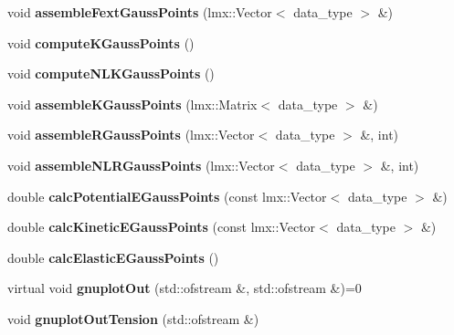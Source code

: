\begin{CompactItemize}
\item 
\hypertarget{classmknix_1_1Cell_7c381e6cbcdb2478505645cad57a2c6e}{
void \textbf{assembleFextGaussPoints} (lmx::Vector$<$ data\_\-type $>$ \&)}
\label{classmknix_1_1Cell_7c381e6cbcdb2478505645cad57a2c6e}

\item 
\hypertarget{classmknix_1_1Cell_379600644881412c03608d3d32c36d49}{
void \textbf{computeKGaussPoints} ()}
\label{classmknix_1_1Cell_379600644881412c03608d3d32c36d49}

\item 
\hypertarget{classmknix_1_1Cell_56231c1df8cd13f6b3f04356da6c2955}{
void \textbf{computeNLKGaussPoints} ()}
\label{classmknix_1_1Cell_56231c1df8cd13f6b3f04356da6c2955}

\item 
\hypertarget{classmknix_1_1Cell_8b703b97535562245382523c3702a054}{
void \textbf{assembleKGaussPoints} (lmx::Matrix$<$ data\_\-type $>$ \&)}
\label{classmknix_1_1Cell_8b703b97535562245382523c3702a054}

\item 
\hypertarget{classmknix_1_1Cell_97fdd8bbf158f3b03b1af601177c2585}{
void \textbf{assembleRGaussPoints} (lmx::Vector$<$ data\_\-type $>$ \&, int)}
\label{classmknix_1_1Cell_97fdd8bbf158f3b03b1af601177c2585}

\item 
\hypertarget{classmknix_1_1Cell_f65d528a607f3215d04449551db94dcd}{
void \textbf{assembleNLRGaussPoints} (lmx::Vector$<$ data\_\-type $>$ \&, int)}
\label{classmknix_1_1Cell_f65d528a607f3215d04449551db94dcd}

\item 
\hypertarget{classmknix_1_1Cell_9aba982ff2a54738ec8b38446d333f8d}{
double \textbf{calcPotentialEGaussPoints} (const lmx::Vector$<$ data\_\-type $>$ \&)}
\label{classmknix_1_1Cell_9aba982ff2a54738ec8b38446d333f8d}

\item 
\hypertarget{classmknix_1_1Cell_a0b40b9534a376333490fe73d921e552}{
double \textbf{calcKineticEGaussPoints} (const lmx::Vector$<$ data\_\-type $>$ \&)}
\label{classmknix_1_1Cell_a0b40b9534a376333490fe73d921e552}

\item 
\hypertarget{classmknix_1_1Cell_1b59c56aa8983a27571c6809b03604c5}{
double \textbf{calcElasticEGaussPoints} ()}
\label{classmknix_1_1Cell_1b59c56aa8983a27571c6809b03604c5}

\item 
\hypertarget{classmknix_1_1Cell_345a938d058d10f60d6c302a715290de}{
virtual void \textbf{gnuplotOut} (std::ofstream \&, std::ofstream \&)=0}
\label{classmknix_1_1Cell_345a938d058d10f60d6c302a715290de}

\item 
\hypertarget{classmknix_1_1Cell_9dc3873b837d37c3843c33e5e6538f1c}{
void \textbf{gnuplotOutTension} (std::ofstream \&)}
\label{classmknix_1_1Cell_9dc3873b837d37c3843c33e5e6538f1c}

\end{CompactItemize}
